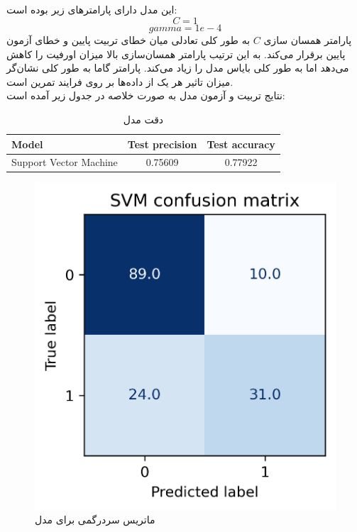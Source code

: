 \documentclass[11pt]{article}
\begin{document}
		\subsection{}
				این مدل دارای پارامترهای زیر بوده است:
		$$C = 1$$
		$$gamma = 1e-4$$
		پارامتر همسان سازی $C$ به طور کلی تعادلی میان خطای تربیت پایین و خطای آزمون پایین برقرار می‌کند. به این ترتیب پارامتر همسان‌سازی بالا میزان اورفیت را کاهش می‌دهد اما به طور کلی بایاس مدل را زیاد می‌کند. پارامتر گاما به طور کلی نشان‌گر میزان تاثیر هر یک از داده‌ها بر روی فرایند تمرین است.\\
		نتایج تربیت و آزمون مدل به صورت خلاصه در جدول زیر آمده است:
		\begin{table}[h!]
		\caption{دقت مدل }
			\begin{latin}
				\centering
				\begin{tabular}{|l|c|c|}
					\hline
					\textbf{Model} & \textbf{Test precision} & \textbf{Test accuracy} \\ \hline
					Support Vector Machine & 0.75609 & 0.77922 \\ \hline
				\end{tabular}
			\end{latin}
			\label{tab:svm_results}
		\end{table}
		\begin{figure}[!h]
			\centerline{\includegraphics[width=0.5\linewidth]{../HW2_2/SVM confusion.png}}
			\caption{ماتریس سردرگمی برای مدل }
			\label{fig:confusion_svm}
		\end{figure}
	\pagebreak
\end{document}
